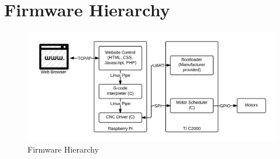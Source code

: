 \chapter{Firmware Hierarchy}

\begin{figure}[!ht]
	\centering
	\includegraphics[width=1\textwidth]{software-design/firmware-hierarchy.png}
	\caption{Firmware Hierarchy}
	\label{fig:firmware-hierarchy}
\end{figure}